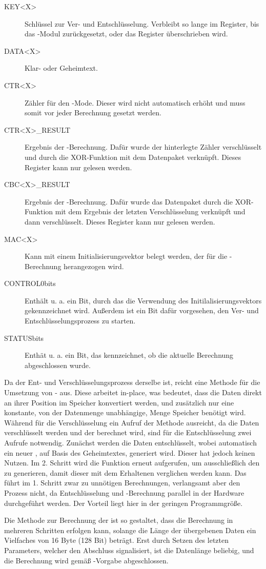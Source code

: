 \begin{description}
  \item[KEY<X>] Schlüssel zur Ver- und Entschlüsselung. Verbleibt so lange im Register, bis das -Modul zurückgesetzt, oder das Register überschrieben wird.
  \item[DATA<X>] Klar- oder Geheimtext.
  \item[CTR<X>] Zähler für den -Mode. Dieser wird nicht automatisch erhöht und muss somit vor jeder Berechnung gesetzt werden.
  \item[CTR<X>\_RESULT] Ergebnis der -Berechnung. Dafür wurde der hinterlegte Zähler verschlüsselt und durch die XOR-Funktion mit dem Datenpaket verknüpft. Dieses Register kann nur gelesen werden.
  \item[CBC<X>\_RESULT] Ergebnis der -Berechnung. Dafür wurde das Datenpaket durch die XOR-Funktion mit dem Ergebnis der letzten Verschlüsselung verknüpft und dann verschlüsselt. Dieses Register kann nur gelesen werden.
  \item[MAC<X>] Kann mit einem Initialisierungsvektor belegt werden, der für die -Berechnung herangezogen wird.
  \item[CONTROL$0$bits] Enthält u. a. ein Bit, durch das die Verwendung des Initilalisierungsvektors gekennzeichnet wird. Außerdem ist ein Bit dafür vorgesehen, den Ver- und Entschlüsselungsprozess zu starten.
  \item[STATUSbits]  Enthät u. a. ein Bit, das kennzeichnet, ob die aktuelle Berechnung abgeschlossen wurde.
\end{description}

Da der Ent- und Verschlüsselungsprozess derselbe ist, reicht eine Methode für die Umsetzung von - aus. Diese arbeitet in-place, was bedeutet,
dass die Daten direkt an ihrer Position im Speicher konvertiert werden, und zusätzlich nur eine konstante, von der Datenmenge unabhängige, Menge Speicher benötigt
wird. Während für die Verschlüsselung ein Aufruf der Methode ausreicht, da die Daten verschlüsselt werden und der  berechnet wird, sind für die Entschlüsselung
zwei Aufrufe notwendig. Zunächst werden die Daten entschlüsselt, wobei automatisch ein neuer , auf Basis des Geheimtextes, generiert wird. Dieser hat jedoch
keinen Nutzen. Im 2. Schritt wird die Funktion erneut aufgerufen, um ausschließlich den  zu generieren, damit dieser mit dem Erhaltenen verglichen werden kann.
Das führt im 1. Schritt zwar zu unnötigen Berechnungen, verlangsamt aber den Prozess nicht, da Entschlüsselung und -Berechnung parallel in der Hardware
durchgeführt werden. Der Vorteil liegt hier in der geringen Programmgröße.

Die Methode zur Berechnung der  ist so gestaltet, dass die Berechnung in mehreren Schritten erfolgen kann, solange die Länge der übergebenen Daten ein
Vielfaches von 16 Byte (128 Bit) beträgt. Erst durch Setzen des letzten Parameters, welcher den Abschluss signalisiert, ist die Datenlänge beliebig, und die
Berechnung wird gemäß -Vorgabe abgeschlossen.